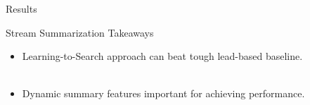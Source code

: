 \begin{frame}{Results}
\end{frame}

\begin{frame}{Stream Summarization Takeaways}
    \begin{itemize}
        \item Learning-to-Search approach can beat tough lead-based baseline.~\\~\\

        \item Dynamic summary features important for achieving performance.
    \end{itemize}
\end{frame}
